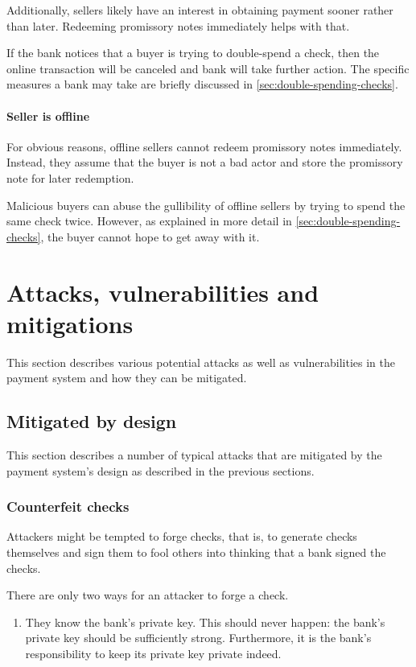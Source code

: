 \documentclass[12pt,a4paper]{article}
\begin{document}
\begin{multicols}{2}
	Additionally, sellers likely have an interest in obtaining payment sooner rather than later. Redeeming promissory notes immediately helps with that.

	If the bank notices that a buyer is trying to double-spend a check, then the online transaction will be canceled and bank will take further action. The specific measures a bank may take are briefly discussed in \autoref{sec:double-spending-checks}.
	
	\paragraph{Seller is offline}
	
	For obvious reasons, offline sellers cannot redeem promissory notes immediately. Instead, they assume that the buyer is not a bad actor and store the promissory note for later redemption.

	Malicious buyers can abuse the gullibility of offline sellers by trying to spend the same check twice. However, as explained in more detail in \autoref{sec:double-spending-checks}, the buyer cannot hope to get away with it.

	\section{Attacks, vulnerabilities and mitigations}

	This section describes various potential attacks as well as vulnerabilities in the payment system and how they can be mitigated.
	
	\subsection{Mitigated by design}
	
	This section describes a number of typical attacks that are mitigated by the payment system's design as described in the previous sections.

	\subsubsection{Counterfeit checks}

	Attackers might be tempted to forge checks, that is, to generate checks themselves and sign them to fool others into thinking that a bank signed the checks.
	
	There are only two ways for an attacker to forge a check.
	
	\begin{enumerate}
		\item They know the bank's private key. This should never happen: the bank's private key should be sufficiently strong. Furthermore, it is the bank's responsibility to keep its private key private indeed.
		

\end{enumerate}
\end{multicols}
\end{document}
